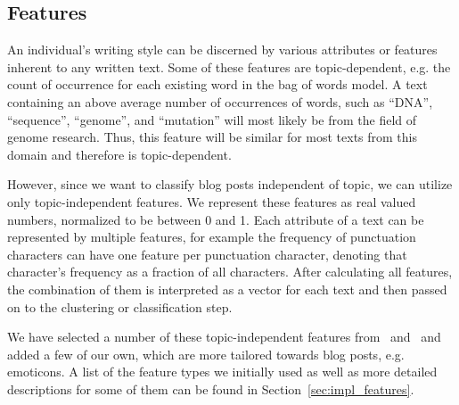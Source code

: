 \subsection{Features}
\label{sec:features}

An individual's writing style can be discerned by various attributes or features inherent to any written text.
Some of these features are topic-dependent, e.g. the count of occurrence for each existing word in the bag of words model.
A text containing an above average number of occurrences of words, such as ``DNA'', ``sequence'', ``genome'', and ``mutation'' will most likely be from the field of genome research.
Thus, this feature will be similar for most texts from this domain and therefore is topic-dependent.


However, since we want to classify blog posts independent of topic, we can utilize only topic-independent features.
We represent these features as real valued numbers, normalized to be between 0  and 1.
Each attribute of a text can be represented by multiple features, for example the frequency of punctuation characters can have one feature per punctuation character, denoting that character's frequency as a fraction of all characters.
After calculating all features, the combination of them is interpreted as a vector for each text and then passed on to the clustering or classification step.


We have selected a number of these topic-independent features from~\cite{madigan2005author} and~\cite{narayanan2012feasibility} and added a few of our own, which are more tailored towards blog posts, e.g. emoticons.
A list of the feature types we initially used as well as more detailed descriptions for some of them can be found in Section~\ref{sec:impl_features}.
